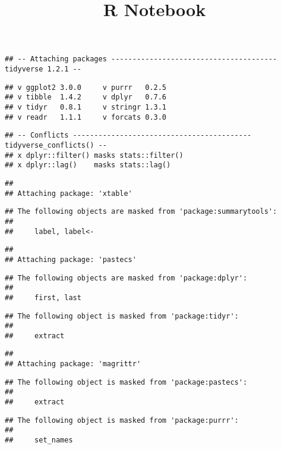 \documentclass[]{article}
\title{R Notebook}
\author{}
\date{}
\begin{document}
\maketitle

\begin{verbatim}
## -- Attaching packages --------------------------------------- tidyverse 1.2.1 --
\end{verbatim}

\begin{verbatim}
## v ggplot2 3.0.0     v purrr   0.2.5
## v tibble  1.4.2     v dplyr   0.7.6
## v tidyr   0.8.1     v stringr 1.3.1
## v readr   1.1.1     v forcats 0.3.0
\end{verbatim}

\begin{verbatim}
## -- Conflicts ------------------------------------------ tidyverse_conflicts() --
## x dplyr::filter() masks stats::filter()
## x dplyr::lag()    masks stats::lag()
\end{verbatim}

\begin{verbatim}
## 
## Attaching package: 'xtable'
\end{verbatim}

\begin{verbatim}
## The following objects are masked from 'package:summarytools':
## 
##     label, label<-
\end{verbatim}

\begin{verbatim}
## 
## Attaching package: 'pastecs'
\end{verbatim}

\begin{verbatim}
## The following objects are masked from 'package:dplyr':
## 
##     first, last
\end{verbatim}

\begin{verbatim}
## The following object is masked from 'package:tidyr':
## 
##     extract
\end{verbatim}

\begin{verbatim}
## 
## Attaching package: 'magrittr'
\end{verbatim}

\begin{verbatim}
## The following object is masked from 'package:pastecs':
## 
##     extract
\end{verbatim}

\begin{verbatim}
## The following object is masked from 'package:purrr':
## 
##     set_names
\end{verbatim}
\end{document}
